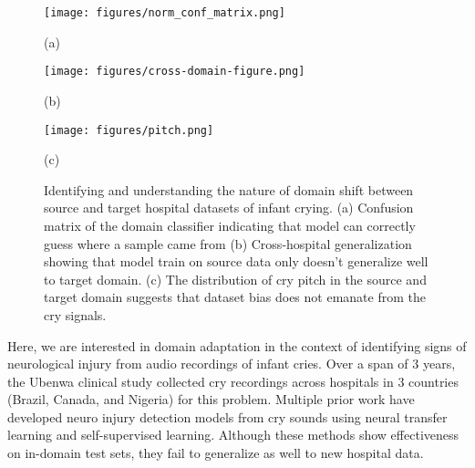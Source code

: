\documentclass{article}
\begin{document}
\begin{figure*}[ht!]
\label{fig:domain-shift-id}
\begin{minipage}[b]{0.33\textwidth}
  \centering
  \centerline{\texttt{[image: figures/norm\_conf\_matrix.png]}}
  \centerline{(a)}\medskip
  \label{fig:1a}
\end{minipage}
%
\begin{minipage}[b]{0.33\textwidth}
  \centering
  \centerline{\texttt{[image: figures/cross-domain-figure.png]}}
  \centerline{(b)}\medskip
  \label{fig:1b}
\end{minipage}
\hfill
\begin{minipage}[b]{0.33\textwidth}
  \centering
  \centerline{\texttt{[image: figures/pitch.png]}}
  \centerline{(c)}\medskip
  \label{fig:1c}
\end{minipage}
%
\caption{Identifying and understanding the nature of domain shift between source and target hospital datasets of infant crying. (a) Confusion matrix of the domain classifier indicating that model can correctly guess where a sample came from (b) Cross-hospital generalization showing that model train on source data only doesn't generalize well to target domain. (c) The distribution of cry pitch in the source and target domain suggests that dataset bias does not emanate from the cry signals.}

\label{fig:identification}
%
\end{figure*}
Here, we are interested in domain adaptation in the context of identifying signs of neurological injury from audio recordings of infant cries. Over a span of 3 years, the Ubenwa clinical study \cite{gorin2023selfsupervised} collected cry recordings across hospitals in 3 countries (Brazil, Canada, and Nigeria) for this problem. Multiple prior work have developed neuro injury detection models from cry sounds using neural transfer learning\cite{onu2020neural} and self-supervised learning\cite{gorin2023selfsupervised}. Although these methods show effectiveness on in-domain test sets, they fail to generalize as well to new hospital data.
\end{document}
